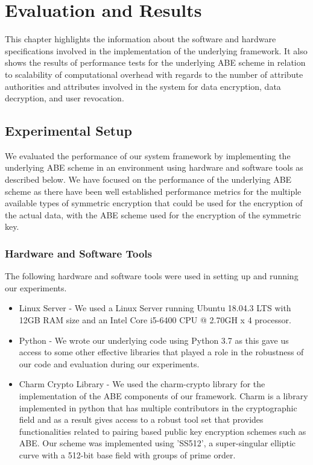 \chapter{Evaluation and Results}
\label{chap:evaluation_and_results}

This chapter highlights the information about the software and hardware specifications involved in the implementation of the underlying framework. It also shows the results of performance tests for the underlying ABE scheme in relation to scalability of computational overhead with regards to the number of attribute authorities and attributes involved in the system for data encryption, data decryption, and user revocation.

\section{Experimental Setup}

We evaluated the performance of our system framework by implementing the underlying ABE scheme in an environment using hardware and software tools as described below. We have focused on the performance of the underlying ABE scheme as there have been well established performance metrics for the multiple available types of symmetric encryption that could be used for the encryption of the actual data, with the ABE scheme used for the encryption of the symmetric key. 

\subsection{Hardware and Software Tools}

The following hardware and software tools were used in setting up and running our experiments.

\begin{itemize}
	\item Linux Server - We used a Linux Server running Ubuntu 18.04.3 LTS with 12GB RAM size and an Intel Core i5-6400 CPU @ 2.70GH x 4 processor.
	
	\item Python - We wrote our underlying code using Python 3.7 as this gave us access to some other effective libraries that played a role in the robustness of our code and evaluation during our experiments.
	
	\item Charm Crypto Library\cite{charm13crypto} - We used the charm-crypto library for the implementation of the ABE components of our framework. Charm is a library implemented in python that has multiple contributors in the cryptographic field and as a result gives access to a robust tool set that provides functionalities related to pairing based public key encryption schemes such as ABE. Our scheme was implemented using 'SS512', a super-singular elliptic curve with a 512-bit base field with groups of prime order.
\end{itemize}

